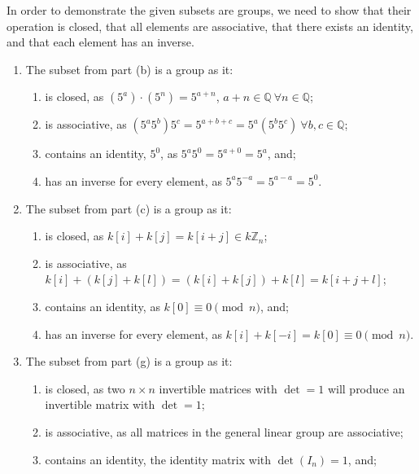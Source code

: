 \documentclass[12pt]{article}
\numberwithin{problem}{section} %
\theoremstyle{remark}  %
\newenvironment{answer}
    {\begin{adjustwidth}{0pt}{0pt}}
    {\end{adjustwidth}}
\begin{document}
    \begin{answer}
        In order to demonstrate the given subsets are groups, we need to show that their operation is closed, that all elements are associative, that there exists an identity, and that each element has an inverse. 
        \begin{enumerate}[label=(\alph*)]
            \item The subset from part (b) is a group as it:\begin{enumerate}[label=(\roman*)]
                \item is closed, as $(5^a)\cdot(5^n) = 5^{a+n}$, $a+n\in\mathbb{Q}\ \forall n\in \mathbb{Q}$;
                \item is associative, as $(5^{a}5^{b})5^{c}=5^{a+b+c}=5^{a}(5^{b}5^{c})\ \forall b,c\in\mathbb{Q}$;
                \item contains an identity, $5^0$, as $5^a5^0=5^{a+0}=5^{a}$, and;
                \item has an inverse for every element, as $5^a5^{-a}=5^{a-a}=5^0$.
            \end{enumerate}
            \item The subset from part (c) is a group as it:
            \begin{enumerate}[label=(\roman*)]
                \item is closed, as $k[i]+k[j]=k[i+j]\in k\mathbb{Z}_n$;
                \item is associative, as $k[i]+(k[j]+k[l]) = (k[i]+k[j])+k[l] = k[i + j + l]$;
                \item contains an identity, as $k[0]\equiv 0 \pmod{n}$, and;
                \item has an inverse for every element, as $k[i]+k[-i]=k[0] \equiv 0 \pmod{n}$.
            \end{enumerate}
            \setcounter{enumi}{6}
            \item The subset from part (g) is a group as it:
            \begin{enumerate}[label=(\roman*)]
                \item is closed, as two $n\times n$ invertible matrices with $\det = 1$ will produce an invertible matrix with $\det = 1$;
                \item is associative, as all matrices in the general linear group are associative;
                \item contains an identity, the identity matrix with $\det(I_n) = 1$, and;

\end{enumerate}
\end{enumerate}
\end{answer}
\end{document}
